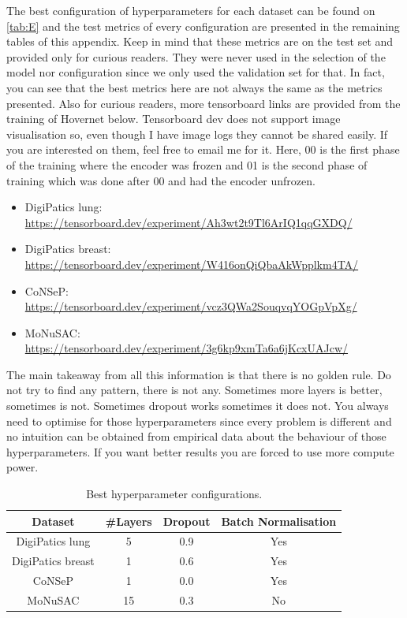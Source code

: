 \noindent The best configuration of hyperparameters for each dataset can be found on \autoref{tab:E} and the test metrics of every configuration are presented in the remaining tables of this appendix. Keep in mind that these metrics are on the test set and provided only for curious readers. They were never used in the selection of the model nor configuration since we only used the validation set for that. In fact, you can see that the best metrics here are not always the same as the metrics presented. Also for curious readers, more tensorboard links are provided from the training of Hovernet below. Tensorboard dev does not support image visualisation so, even though I have image logs they cannot be shared easily. If you are interested on them, feel free to email me for it. Here, 00 is the first phase of the training where the encoder was frozen and 01 is the second phase of training which was done after 00 and had the encoder unfrozen.

\begin{itemize}
    \item DigiPatics lung: \url{https://tensorboard.dev/experiment/Ah3wt2t9Tl6ArIQ1qqGXDQ/}
    \item DigiPatics breast: \url{https://tensorboard.dev/experiment/W416onQiQbaAkWpplkm4TA/}
    \item CoNSeP: \url{https://tensorboard.dev/experiment/vcz3QWa2SouqvqYOGpVpXg/}
    \item MoNuSAC: \url{https://tensorboard.dev/experiment/3g6kp9xmTa6a6jKcxUAJcw/}
\end{itemize}

The main takeaway from all this information is that there is no golden rule. Do not try to find any pattern, there is not any. Sometimes more layers is better, sometimes is not. Sometimes dropout works sometimes it does not. You always need to optimise for those hyperparameters since every problem is different and no intuition can be obtained from empirical data about the behaviour of those hyperparameters. If you want better results you are forced to use more compute power.

\begin{table}[ht]
    \centering
    \caption{Best hyperparameter configurations.}
    \begin{tabular}{|c|c|c|c|}
    \hline
    Dataset & \#Layers & Dropout & Batch Normalisation\\ \hline
       DigiPatics lung  & 5 & 0.9 & Yes \\ \hline
       DigiPatics breast  & 1 & 0.6 & Yes \\ \hline
       CoNSeP  & 1 & 0.0 & Yes \\ \hline
       MoNuSAC  & 15 & 0.3 & No \\ \hline
    \end{tabular}
    \label{tab:E}
\end{table}


